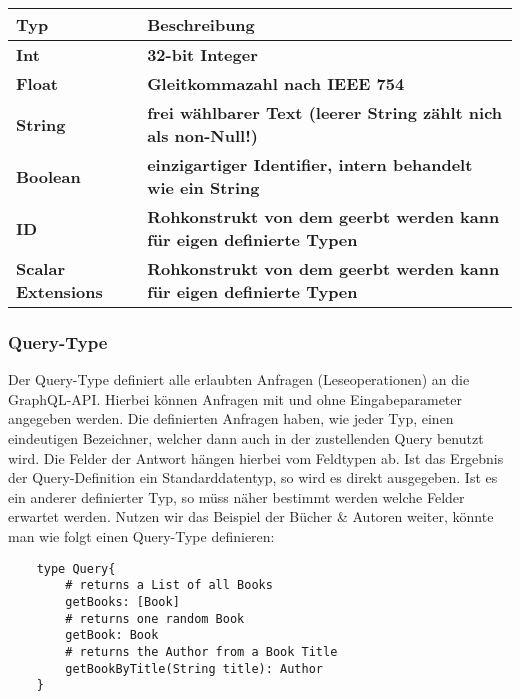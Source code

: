 \begin{center}
    \begin{table}[!ht]
        \begin{tabularx}{\textwidth}{|C|C|}
            \hline
            \textbf{ Typ } & \textbf{ Beschreibung} \\
            \hline
            \textbf{ Int } & \textbf{ 32-bit Integer } \\
            \hline
            \textbf{ Float  } & \textbf{ Gleitkommazahl nach IEEE 754 } \\
            \hline
            \textbf{ String } & \textbf{ frei wählbarer Text (leerer String zählt nich als non-Null!) } \\
            \hline
            \textbf{ Boolean } & \textbf{ einzigartiger Identifier, intern behandelt wie ein String } \\
            \hline
            \textbf{ ID } & \textbf{ Rohkonstrukt von dem geerbt werden kann für eigen definierte Typen } \\
            \hline
            \textbf{ Scalar Extensions } & \textbf{ Rohkonstrukt von dem geerbt werden kann für eigen definierte Typen } \\
            \hline
        \end{tabularx}
    \end{table}
    \cite[vgl. 3.5 Scalars]{graphqlspecification}
\end{center}


\subsubsection{Query-Type}

Der Query-Type definiert alle erlaubten Anfragen (Leseoperationen) an die GraphQL-API.
Hierbei können Anfragen mit und ohne Eingabeparameter angegeben werden.
Die definierten Anfragen haben, wie jeder Typ, einen eindeutigen Bezeichner, welcher dann auch in der zustellenden Query
benutzt wird.
Die Felder der Antwort hängen hierbei vom Feldtypen ab. Ist das Ergebnis der Query-Definition ein Standarddatentyp, so wird
es direkt ausgegeben. Ist es ein anderer definierter Typ, so müss näher bestimmt werden welche Felder erwartet werden.
Nutzen wir das Beispiel der Bücher & Autoren weiter, könnte man wie folgt einen Query-Type definieren:

\begin{verbatim}
    type Query{
        # returns a List of all Books
        getBooks: [Book]
        # returns one random Book
        getBook: Book
        # returns the Author from a Book Title
        getBookByTitle(String title): Author
    }
\end{verbatim}


